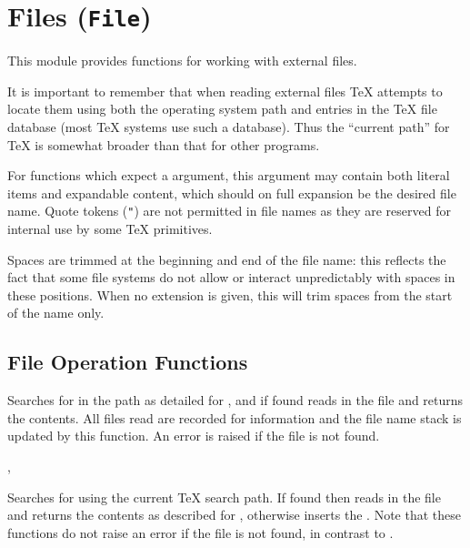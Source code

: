\documentclass[oneside]{book}
\begin{document}
\chapter{Files (\texttt{File})}

This module provides functions for working with external files.

It is important to remember that when reading external files \TeX{}
attempts to locate them using both the operating system path and entries in the
\TeX{} file database (most \TeX{} systems use such a database). Thus the
\enquote{current path} for \TeX{} is somewhat broader than that for other
programs.

For functions which expect a  argument, this argument
may contain both literal items and expandable content, which should on
full expansion be the desired file name.
Quote tokens (\verb|"|) are not permitted in file names as they are reserved
for internal use by some \TeX{} primitives.

Spaces are trimmed at the beginning and end of the file name:
this reflects the fact that some file systems do not allow or interact
unpredictably with spaces in these positions. When no extension is given,
this will trim spaces from the start of the name only.

\section{File Operation Functions}

\begin{function}{\fileInput}
\begin{syntax}
 
\end{syntax}
Searches for  in the path as detailed for
, and if found reads in the file and
returns the contents. All files read are recorded
for information and the file name stack is updated by this
function. An error is raised if the file is not found.
\end{function}

\begin{function}{\fileIfExistInput,\fileIfExistInputF}
\begin{syntax}
 
  
\end{syntax}
Searches for  using the current \TeX{} search path.
If found then reads in the file and returns the contents as described
for , otherwise inserts the .
Note that these functions do not raise
an error if the file is not found, in contrast to .
\end{function}
\end{document}
